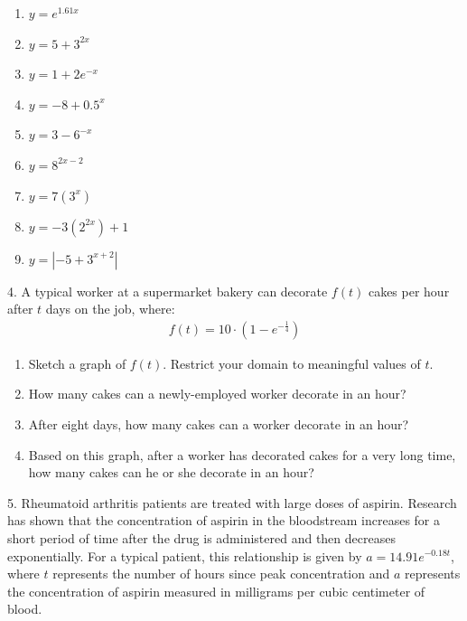 \documentclass[10pt,]{book}
\theoremstyle{plain}
\theoremstyle{definition}
\theoremstyle{definition}
\theoremstyle{definition}
\numberwithin{equation}{section}
\begin{document}
\begin{exerciselist}
\begin{enumerate}[label=(\alph*)]
\item\hypertarget{li-129}{}\(y=e^{1.61x}\)%
\item\hypertarget{li-130}{}\(y=5+3^{2x}\)%
\item\hypertarget{li-131}{}\(y=1+2e^{-x}\)%
\item\hypertarget{li-132}{}\(y=-8+0.5^x\)%
\item\hypertarget{li-133}{}\(y=3-6^{-x}\)%
\item\hypertarget{li-134}{}\(y=8^{2x-2}\)%
\item\hypertarget{li-135}{}\(y=7(3^x)\)%
\item\hypertarget{li-136}{}\(y=-3(2^{2x})+1\)%
\item\hypertarget{li-137}{}\(y=|-5+3^{x+2}|\)%
\end{enumerate}
\par\smallskip
\item[4.]\hypertarget{exercise-65}{}\hypertarget{p-261}{}%
A typical worker at a supermarket bakery can decorate \(f(t)\) cakes per hour after \(t\) days on the job, where:%
%
\begin{gather*}
f(t)=10 \cdot ( 1-e^{-\frac{1}{4}} )
\end{gather*}
\leavevmode%
\begin{enumerate}[label=(\alph*)]
\item\hypertarget{li-138}{}Sketch a graph of \(f(t)\). Restrict your domain to meaningful values of \(t\).%
\item\hypertarget{li-139}{}How many cakes can a newly-employed worker decorate in an hour?%
\item\hypertarget{li-140}{}After eight days, how many cakes can a worker decorate in an hour?%
\item\hypertarget{li-141}{}Based on this graph, after a worker has decorated cakes for a very long time, how many cakes can he or she decorate in an hour?%
\end{enumerate}
\par\smallskip
\item[5.]\hypertarget{exercise-66}{}\hypertarget{p-262}{}%
Rheumatoid arthritis patients are treated with large doses of aspirin.  Research has shown that the concentration of aspirin in the bloodstream increases for a short period of time after the drug is administered and then decreases exponentially.  For a typical patient, this relationship is given by \(a=14.91e^{-0.18t}\), where \(t\) represents the number of hours since peak concentration and \(a\) represents the concentration of aspirin measured in milligrams per cubic centimeter of blood.%

\end{exerciselist}
\end{document}
